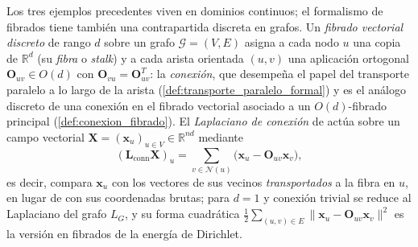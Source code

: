 \begin{example}\label{ex:bundle_neural_networks}
Los tres ejemplos precedentes viven en dominios continuos; el formalismo de fibrados tiene también una contrapartida discreta en grafos. Un \textit{fibrado vectorial discreto} de rango $d$ sobre un grafo $\mathcal{G} = (V, E)$ asigna a cada nodo $u$ una copia de $\mathbb{R}^d$ (su \textit{fibra} o \textit{stalk}) y a cada arista orientada $(u,v)$ una aplicación ortogonal $\mathbf{O}_{uv} \in O(d)$ con $\mathbf{O}_{vu} = \mathbf{O}_{uv}^T$: la \textit{conexión}, que desempeña el papel del transporte paralelo a lo largo de la arista (\autoref{def:transporte_paralelo_formal}) y es el análogo discreto de una conexión en el fibrado vectorial asociado a un $O(d)$-fibrado principal (\autoref{def:conexion_fibrado}). El \textit{Laplaciano de conexión} de \citet{singer2012vector} actúa sobre un campo vectorial $\mathbf{X} = (\mathbf{x}_u)_{u \in V} \in \mathbb{R}^{nd}$ mediante
\begin{equation}
(\mathbf{L}_{\mathrm{conn}} \mathbf{X})_u = \sum_{v \in \mathcal{N}(u)} \bigl(\mathbf{x}_u - \mathbf{O}_{uv}\mathbf{x}_v\bigr),
\end{equation}
es decir, compara $\mathbf{x}_u$ con los vectores de sus vecinos \textit{transportados} a la fibra en $u$, en lugar de con sus coordenadas brutas; para $d = 1$ y conexión trivial se reduce al Laplaciano del grafo $L_G$, y su forma cuadrática $\frac12\sum_{(u,v) \in E}\|\mathbf{x}_u - \mathbf{O}_{uv}\mathbf{x}_v\|^2$ es la versión en fibrados de la energía de Dirichlet.


\end{example}
